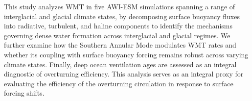 \documentclass[pdflatex,sn-nature]{sn-jnl}
\begin{document}





This study analyzes WMT in five AWI-ESM simulations spanning a range of interglacial and glacial climate states, by decomposing surface buoyancy fluxes into radiative, turbulent, and haline components to identify the mechanisms governing dense water formation across interglacial and glacial regimes. We further examine how the Southern Annular Mode  modulates WMT rates and whether its coupling with surface buoyancy forcing remains robust across varying climate states. Finally, deep ocean ventilation ages are assessed as an integral diagnostic of overturning efficiency. This analysis serves as  an integral proxy for evaluating the efficiency of the overturning circulation in response to surface forcing shifts.

\end{document}
